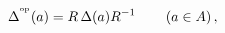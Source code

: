 \begin{equation}\label{boro2.4}
\Delta^{^{\rm op}}(a)=R\,\Delta(a)R^{-1}\,\qquad (a\in A)\,,
\end{equation}

